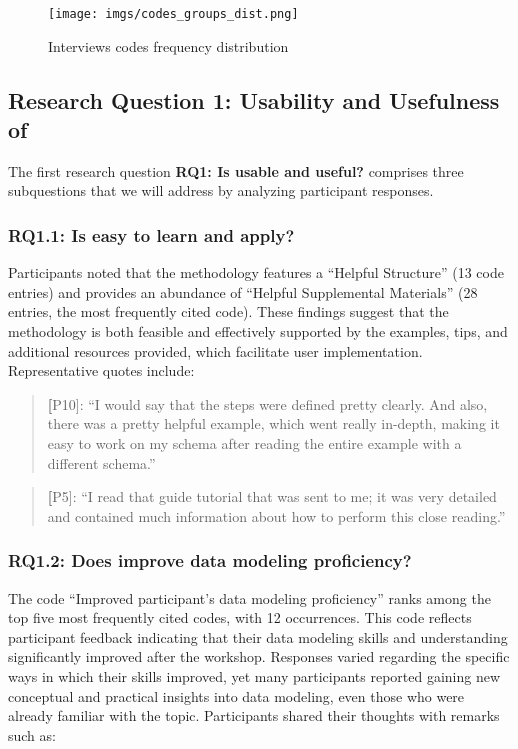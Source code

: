 \begin{figure}[htbp]
    \texttt{[image: imgs/codes\_groups\_dist.png]}
    \caption{Interviews codes frequency distribution}
    \label{fig:code_dist}
\end{figure}

\subsection{Research Question 1: Usability and Usefulness of \credal}

The first research question \textbf{RQ1: Is \credal usable and useful?} comprises three subquestions that we will address by analyzing participant responses.

\subsubsection{\textbf{RQ1.1}: Is \credal easy to learn and apply?}

Participants noted that the methodology features a ``Helpful Structure'' (13 code entries) and provides an abundance of ``Helpful Supplemental Materials'' (28 entries, the most frequently cited code). These findings suggest that the methodology is both feasible and effectively supported by the examples, tips, and additional resources provided, which facilitate user implementation.  Representative quotes include:

\begin{quote}
\textbf[P10]: ``I would say that the steps were defined pretty clearly. And also, there was a pretty helpful example, which went really in-depth, making it easy to work on my schema after reading the entire example with a different schema.''
\end{quote}

\begin{quote}
\textbf[P5]: ``I read that guide tutorial that was sent to me; it was very detailed and contained much information about how to perform this close reading.''
\end{quote}

\subsubsection{\textbf{RQ1.2}: Does \credal improve data modeling proficiency?}

The code ``Improved participant's data modeling proficiency'' ranks among the top five most frequently cited codes, with 12 occurrences. This code reflects participant feedback indicating that their data modeling skills and understanding significantly improved after the workshop.  Responses varied regarding the specific ways in which their skills improved, yet many participants reported gaining new conceptual and practical insights into data modeling, even those who were already familiar with the topic. Participants shared their thoughts with remarks such as:

